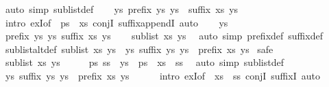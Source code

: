 \begin{isabellebody}
\ {\isacharparenleft}auto\ simp{\isacharcolon}\ sublist{\isacharunderscore}def{\isacharparenright}\isanewline
\ \ \isamarkupfalse%
\ {\isachardoublequoteopen}{\isasymexists}ys{\isacharprime}{\isachardot}\ prefix\ ys{\isacharprime}\ ys\ {\isasymand}\ suffix\ xs\ ys{\isacharprime}{\isachardoublequoteclose}\isanewline
\ \ \ \ \isamarkupfalse%
\ {\isacharparenleft}intro\ exI{\isacharbrackleft}of\ {\isacharunderscore}\ {\isachardoublequoteopen}ps\ {\isacharat}\ xs{\isachardoublequoteclose}{\isacharbrackright}\ conjI\ suffix{\isacharunderscore}appendI{\isacharparenright}\ auto\isanewline
{}\isamarkupfalse%
\isanewline
\ \ \isamarkupfalse%
\ ys{\isacharprime}\isanewline
\ \ \isamarkupfalse%
\ {\isachardoublequoteopen}prefix\ ys{\isacharprime}\ ys{\isachardoublequoteclose}\ {\isachardoublequoteopen}suffix\ xs\ ys{\isacharprime}{\isachardoublequoteclose}\isanewline
\ \ \isamarkupfalse%
\ {\isachardoublequoteopen}sublist\ xs\ ys{\isachardoublequoteclose}\ \isamarkupfalse%
\ {\isacharparenleft}auto\ simp{\isacharcolon}\ prefix{\isacharunderscore}def\ suffix{\isacharunderscore}def{\isacharparenright}\isanewline
{}\isamarkupfalse%
%
\endisatagproof
{\isafoldproof}%
%
\isadelimproof
\isanewline
%
\endisadelimproof
\ \ \isanewline
{}\isamarkupfalse%
\ sublist{\isacharunderscore}altdef{\isacharprime}{\isacharcolon}\ {\isachardoublequoteopen}sublist\ xs\ ys\ {\isasymlongleftrightarrow}\ {\isacharparenleft}{\isasymexists}ys{\isacharprime}{\isachardot}\ suffix\ ys{\isacharprime}\ ys\ {\isasymand}\ prefix\ xs\ ys{\isacharprime}{\isacharparenright}{\isachardoublequoteclose}\isanewline
%
\isadelimproof
%
\endisadelimproof
%
\isatagproof
{}\isamarkupfalse%
\ safe\isanewline
\ \ \isamarkupfalse%
\ {\isachardoublequoteopen}sublist\ xs\ ys{\isachardoublequoteclose}\isanewline
\ \ \isamarkupfalse%
\ \isamarkupfalse%
\ ps\ ss\ \ {\isachardoublequoteopen}ys\ {\isacharequal}\ ps\ {\isacharat}\ xs\ {\isacharat}\ ss{\isachardoublequoteclose}\ \isamarkupfalse%
\ {\isacharparenleft}auto\ simp{\isacharcolon}\ sublist{\isacharunderscore}def{\isacharparenright}\isanewline
\ \ \isamarkupfalse%
\ {\isachardoublequoteopen}{\isasymexists}ys{\isacharprime}{\isachardot}\ suffix\ ys{\isacharprime}\ ys\ {\isasymand}\ prefix\ xs\ ys{\isacharprime}{\isachardoublequoteclose}\isanewline
\ \ \ \ \isamarkupfalse%
\ {\isacharparenleft}intro\ exI{\isacharbrackleft}of\ {\isacharunderscore}\ {\isachardoublequoteopen}xs\ {\isacharat}\ ss{\isachardoublequoteclose}{\isacharbrackright}\ conjI\ suffixI{\isacharparenright}\ auto\isanewline

\end{isabellebody}
